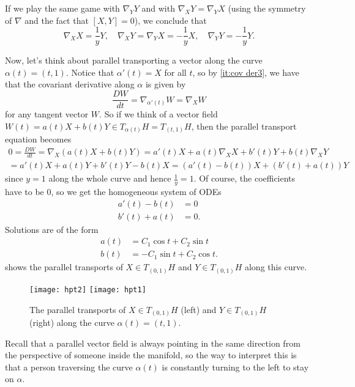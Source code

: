 \begin{example}
	If we play the same game with $\nabla_YY$ and with $\nabla_XY = \nabla_YX$ (using the symmetry of $\nabla$ and the fact that $[X,Y] = 0$), we conclude that
	\begin{equation}\label{eq:hyperbolic plane Christoffel}
		\nabla_XX = \frac{1}{y}Y , \quad \nabla_XY = \nabla_YX = -\frac{1}{y}X, \quad \nabla_YY = -\frac{1}{y}Y.
	\end{equation}
	
	Now, let's think about parallel transporting a vector along the curve $\alpha(t) = (t,1)$. Notice that $\alpha'(t) = X$ for all $t$, so by \ref{it:cov der3}, we have that the covariant derivative along $\alpha$ is given by
	\[
		\frac{DW}{dt} = \nabla_{\alpha'(t)} W = \nabla_X W
	\]
	for any tangent vector $W$. So if we think of a vector field $W(t) = a(t)X + b(t)Y \in T_{\alpha(t)}H = T_{(t,1)}H$, then the parallel transport equation becomes
	\begin{multline*}
		0 = \frac{DW}{dt} = \nabla_X (a(t)X + b(t)Y) = a'(t) X + a(t) \nabla_X X + b'(t)Y + b(t) \nabla_X Y \\
		= a'(t) X +a(t)Y + b'(t) Y - b(t)X = (a'(t)-b(t))X + (b'(t)+a(t))Y
	\end{multline*}
	since $y=1$ along the whole curve and hence $\frac{1}{y} = 1$. Of course, the coefficients have to be 0, so we get the homogeneous system of ODEs
	\begin{align*}
		a'(t)-b(t) & = 0 \\
		b'(t)+a(t) & = 0.
	\end{align*}
	Solutions are of the form
	\begin{align*}
		a(t) & = C_1 \cos t + C_2 \sin t \\
		b(t) & = -C_1 \sin t + C_2 \cos t.
	\end{align*}
	 shows the parallel transports of $X \in T_{(0,1)}H$ and $Y \in T_{(0,1)}H$ along this curve.
	\begin{figure}[htbp]
		\centering
			\texttt{[image: hpt2]}
			\qquad 
			\texttt{[image: hpt1]}
		\caption{The parallel transports of $X \in T_{(0,1)}H$ (left) and $Y \in T_{(0,1)}H$ (right) along the curve $\alpha(t) = (t,1)$.}
		\label{fig:hpt}
	\end{figure}
	
	Recall that a parallel vector field is always pointing in the same direction from the perspective of someone inside the manifold, so the way to interpret this is that a person traversing the curve $\alpha(t)$ is constantly turning to the left to stay on $\alpha$.
	

\end{example}
